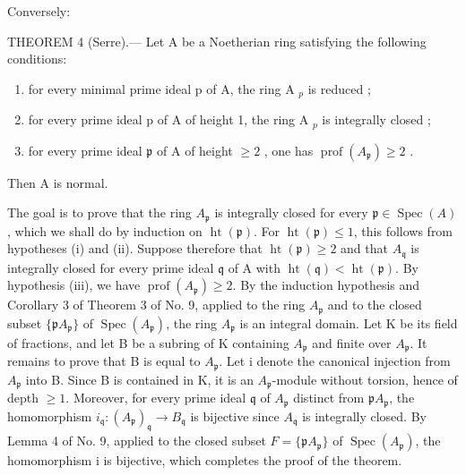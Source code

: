 Conversely:

THEOREM 4 (Serre).--- Let A be a Noetherian ring satisfying the following conditions:

\begin{enumerate}
\def\labelenumi{(\roman{enumi})}
\item
  for every minimal prime ideal p of A, the ring A \(_{p}\) is reduced ;
\item
  for every prime ideal p of A of height 1, the ring A \(_{p}\) is integrally closed ;
\item
  for every prime ideal \(\mathfrak{p}\) of A of height \(\geqslant 2\) , one has \(\operatorname{prof}(A_{\mathfrak{p}}) \geqslant 2\) .
\end{enumerate}

Then A is normal.

The goal is to prove that the ring \(A_{\mathfrak{p}}\) is integrally closed for every \(\mathfrak{p} \in \operatorname{Spec}(A)\), which we shall do by induction on \(\operatorname{ht}(\mathfrak{p})\). For \(\operatorname{ht}(\mathfrak{p}) \leqslant 1\), this follows from hypotheses (i) and (ii). Suppose therefore that \(\operatorname{ht}(\mathfrak{p}) \geqslant 2\) and that \(A_{\mathfrak{q}}\) is integrally closed for every prime ideal \(\mathfrak{q}\) of A with \(\operatorname{ht}(\mathfrak{q}) < \operatorname{ht}(\mathfrak{p})\). By hypothesis (iii), we have \(\operatorname{prof}(A_{\mathfrak{p}}) \geqslant 2\). By the induction hypothesis and Corollary 3 of Theorem 3 of No. 9, applied to the ring \(A_{\mathfrak{p}}\) and to the closed subset \(\{\mathfrak{p}A_{\mathfrak{p}}\}\) of \(\operatorname{Spec}(A_{\mathfrak{p}})\), the ring \(A_{\mathfrak{p}}\) is an integral domain. Let K be its field of fractions, and let B be a subring of K containing \(A_{\mathfrak{p}}\) and finite over \(A_{\mathfrak{p}}\). It remains to prove that B is equal to \(A_{\mathfrak{p}}\). Let i denote the canonical injection from \(A_{\mathfrak{p}}\) into B. Since B is contained in K, it is an \(A_{\mathfrak{p}}\)-module without torsion, hence of depth \(\geqslant 1\). Moreover, for every prime ideal \(\mathfrak{q}\) of \(A_{\mathfrak{p}}\) distinct from \(\mathfrak{p}A_{\mathfrak{p}}\), the homomorphism \(i_{\mathfrak{q}}: (A_{\mathfrak{p}})_{\mathfrak{q}} \to B_{\mathfrak{q}}\) is bijective since \(A_{\mathfrak{q}}\) is integrally closed. By Lemma 4 of No. 9, applied to the closed subset \(F = \{\mathfrak{p}A_{\mathfrak{p}}\}\) of \(\operatorname{Spec}(A_{\mathfrak{p}})\), the homomorphism i is bijective, which completes the proof of the theorem.

